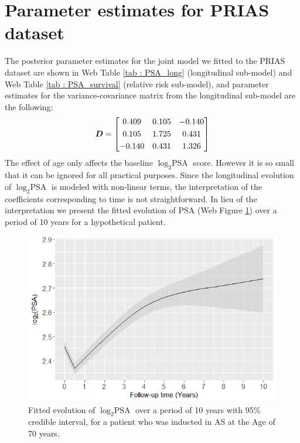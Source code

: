 
\section{Parameter estimates for PRIAS dataset}
\label{sec : param_estimates_jm_fit_prias}
The posterior parameter estimates for the joint model we fitted to the PRIAS dataset are shown in Web Table \ref{tab : PSA_long} (longitudinal sub-model) and Web Table \ref{tab : PSA_survival} (relative risk sub-model), and parameter estimates for the variance-covariance matrix from the longitudinal sub-model are the following:
\begin{equation*}
\boldsymbol{D} = \begin{bmatrix}
       0.409 & 0.105 & -0.140 \\[0.3em]
       0.105 & 1.725 & 0.431 \\[0.3em]
       -0.140 & 0.431 & 1.326
     \end{bmatrix}
\end{equation*} The effect of age only affects the baseline $\log_2 \mbox{PSA}$ score. However it is so small that it can be ignored for all practical purposes. Since the longitudinal evolution of $\log_2 \mbox{PSA}$ is modeled with non-linear terms, the interpretation of the coefficients corresponding to time is not straightforward. In lieu of the interpretation we present the fitted evolution of PSA (Web Figure \ref{fig : fitted_trend_psa}) over a period of 10 years for a hypothetical patient.

\begin{figure}[!htb]
\centerline{\includegraphics[width=\columnwidth]{images/fitted_trend_psa.png}}
\caption{Fitted evolution of $\log_2 \mbox{PSA}$ over a period of 10 years with 95\% credible interval, for a patient who was inducted in AS at the Age of 70 years.}
\label{fig : fitted_trend_psa}
\end{figure}

